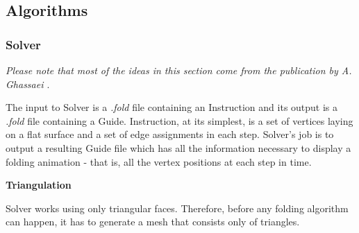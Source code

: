 \subsection{Algorithms}

\subsubsection{Solver}
\label{section:algorithms-Solver}

\textit{Please note that most of the ideas in this section come from the publication by A. Ghassaei \cite{origami-simulator:paper}}.
\smallskip

The input to Solver is a \textit{.fold} file containing an Instruction and its output is a \textit{.fold} file containing a Guide. 
Instruction, at its simplest, is a set of vertices laying on a flat surface and a set of edge assignments in each step.
Solver's job is to output a resulting Guide file which has all the information necessary to display
a folding animation - that is, all the vertex positions at each step in time.


\smallskip
\textbf{Triangulation}
\smallskip

Solver works using only triangular faces.
Therefore, before any folding algorithm can happen, it has to generate a mesh that consists only of triangles.
\begin{figure}[H]
    \centering
    \qquad
\end{figure}

